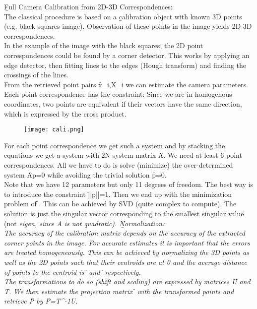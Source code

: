 \b{Full Camera Calibration from 2D-3D Correspondences:\\[0.5em]}
The classical procedure is based on a \b{calibration object} with known 3D points (e.g. black squares image). Observation of these points in the image yields 2D-3D correspondences.\\
In the example of the image with the black squares, the 2D point correspondences could be found by a corner detector. This works by applying an edge detector, then fitting lines to the edges (Hough transform) and finding the crossings of the lines.\\
From the retrieved point pairs \f{x_i,X_i} we can estimate the camera parameters. Each point correspondence has the constraint:
Since we are in homogenous coordinates, two points are equivalent if their vectors have the same direction, which is expressed by the cross product.\\

\begin{figure}[h!]
    \centering
    \texttt{[image: cali.png]}
\end{figure}

For each point correspondence we get such a system and by stacking the equations we get a system with \f{2N} \b{system matrix} \f{A}. We need at least 6 point correspondences. All we have to do is solve (minimize) the over-determined system \f{Ap=0} while avoiding the trivial solution \f{p=0}.\\
Note that we have 12 parameters but only 11 degrees of freedom. The best way is to introduce the constraint \f{||p||=1}. Then we end up with the minimization problem of \f{}. This can be achieved by SVD (quite complex to compute). The solution is just the singular vector corresponding to the smallest singular value (not \it{eigen}, since A is not quadratic).
\newpage
\b{Normalization:\\[0.5em]}
The accuracy of the calibration matrix depends on the accuracy of the extracted corner points in the image. For accurate estimates it is important that the errors are treated homogeneously. This can be achieved by normalizing the 3D points as well as the 2D points such that their centroids are at 0 and the average distance of points to the centroid is \f{} and \f{} respectively.\\
The transformations to do so (shift and scaling) are expressed by matrices \f{U} and \f{T}. We then estimate the projection matrix \f{} with the transformed points and retrieve \f{P} by \f{P=T^{-1}U}.\\

